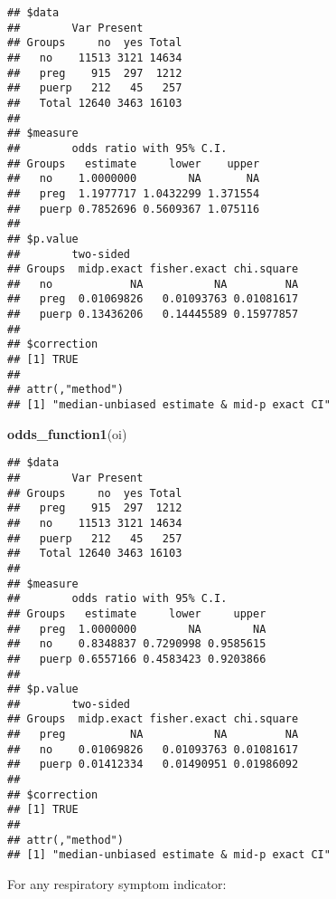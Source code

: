 \documentclass[
]{article}
\newenvironment{Shaded}{\begin{snugshade}}{\end{snugshade}}
\newcommand{\DataTypeTok}[1]{\textcolor[rgb]{0.13,0.29,0.53}{#1}}
\newcommand{\KeywordTok}[1]{\textcolor[rgb]{0.13,0.29,0.53}{\textbf{#1}}}
\newcommand{\NormalTok}[1]{#1}
\newcommand{\OperatorTok}[1]{\textcolor[rgb]{0.81,0.36,0.00}{\textbf{#1}}}
\newcommand{\OtherTok}[1]{\textcolor[rgb]{0.56,0.35,0.01}{#1}}
\newcommand{\StringTok}[1]{\textcolor[rgb]{0.31,0.60,0.02}{#1}}
\begin{document}
\begin{verbatim}
## $data
##        Var Present
## Groups     no  yes Total
##   no    11513 3121 14634
##   preg    915  297  1212
##   puerp   212   45   257
##   Total 12640 3463 16103
## 
## $measure
##        odds ratio with 95% C.I.
## Groups   estimate     lower    upper
##   no    1.0000000        NA       NA
##   preg  1.1977717 1.0432299 1.371554
##   puerp 0.7852696 0.5609367 1.075116
## 
## $p.value
##        two-sided
## Groups  midp.exact fisher.exact chi.square
##   no            NA           NA         NA
##   preg  0.01069826   0.01093763 0.01081617
##   puerp 0.13436206   0.14445589 0.15977857
## 
## $correction
## [1] TRUE
## 
## attr(,"method")
## [1] "median-unbiased estimate & mid-p exact CI"
\end{verbatim}

\begin{Shaded}
\begin{Highlighting}[]
\KeywordTok{odds_function1}\NormalTok{(oi)}
\end{Highlighting}
\end{Shaded}

\begin{verbatim}
## $data
##        Var Present
## Groups     no  yes Total
##   preg    915  297  1212
##   no    11513 3121 14634
##   puerp   212   45   257
##   Total 12640 3463 16103
## 
## $measure
##        odds ratio with 95% C.I.
## Groups   estimate     lower     upper
##   preg  1.0000000        NA        NA
##   no    0.8348837 0.7290998 0.9585615
##   puerp 0.6557166 0.4583423 0.9203866
## 
## $p.value
##        two-sided
## Groups  midp.exact fisher.exact chi.square
##   preg          NA           NA         NA
##   no    0.01069826   0.01093763 0.01081617
##   puerp 0.01412334   0.01490951 0.01986092
## 
## $correction
## [1] TRUE
## 
## attr(,"method")
## [1] "median-unbiased estimate & mid-p exact CI"
\end{verbatim}

For any respiratory symptom indicator:

\begin{Shaded}
\end{Shaded}
\end{document}
